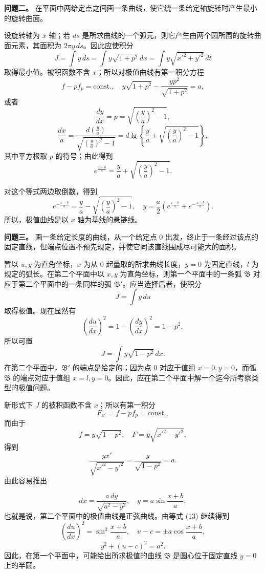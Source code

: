 \documentclass[11pt,a4paper,leqno]{article}
\providecommand{\lg}{\operatorname{lg}}
\begin{document}
\medskip
\noindent\textbf{问题二。} 在平面中两给定点之间画一条曲线，使它绕一条给定轴旋转时产生最小的旋转曲面。

设旋转轴为 $x$ 轴；若 $ds$ 是所求曲线的一个弧元，则它产生由两个圆所围的旋转曲面元素，其面积为 $2\pi y\,ds$。因此应使积分
\[
J=\int y\,ds=\int y\sqrt{1+p^2}\,dx=\int y\sqrt{x'^2+y'^2}\,dt
\]
取得最小值。被积函数不含 $x$；所以对极值曲线有第一积分方程
\[
f-pf_p=\mathrm{const.},\quad y\sqrt{1+p^2}-\frac{yp^2}{\sqrt{1+p^2}}=a,
\]
或者
\[
\frac{dy}{dx}=p=\sqrt{\left(\frac{y}{a}\right)^2-1},
\]
\[
\frac{dx}{a}=\frac{d\left(\frac{y}{a}\right)}{\sqrt{\left(\frac{y}{a}\right)^2-1}}=d\lg\left\{\frac{y}{a}+\sqrt{\left(\frac{y}{a}\right)^2-1}\right\},
\]
其中平方根取 $p$ 的符号；由此得到
\[
e^{\frac{x-b}{a}}=\frac{y}{a}+\sqrt{\left(\frac{y}{a}\right)^2-1}.
\]

对这个等式两边取倒数，得到
\[
e^{-\frac{x-b}{a}}=\frac{y}{a}-\sqrt{\left(\frac{y}{a}\right)^2-1},\quad
y=\frac{a}{2}\left(e^{\frac{x-b}{a}}+e^{-\frac{x-b}{a}}\right).
\]
所以，极值曲线是以 $x$ 轴为基线的悬链线。

\medskip
\noindent\textbf{问题三。} 画一条给定长度的曲线，从一个给定点 $0$ 出发，终止于一条经过该点的固定直线，但端点位置不预先规定，并使它同该直线围成尽可能大的面积。

暂以 $u,y$ 为直角坐标，$x$ 为从 $0$ 起量取的所求曲线长度，$y=0$ 为固定直线，$l$ 为规定的弧长。在第二个平面中以 $x,y$ 为直角坐标，则第一个平面中的一条弧 $\mathfrak{B}$ 对应于第二个平面中的一条同样的弧 $\mathfrak{B}'$。应当选择后者，使积分
\[
J=\int y\,du
\]
取得极值。现在显然有
\begin{equation}\tag{13}
\left(\frac{du}{dx}\right)^2=1-\left(\frac{dy}{dx}\right)^2=1-p^2,
\end{equation}
所以可置
\[
J=\int y\sqrt{1-p^2}\,dx.
\]
在第二个平面中，$\mathfrak{B}'$ 的端点是给定的；因为点 $0$ 对应于值组 $x=0,y=0$，而弧 $\mathfrak{B}$ 的端点对应于值组 $x=l,y=0$。因此，应在第二个平面中解一个迄今所考察类型的极值问题。

新形式下 $J$ 的被积函数不含 $x$；所以有第一积分
\[
F_{x'}=f-pf_p=\mathrm{const.},
\]
而由于
\[
f=y\sqrt{1-p^2},\quad F=y\sqrt{x'^2-y'^2},
\]
得到
\[
\frac{yx'}{\sqrt{x'^2-y'^2}}=\frac{y}{\sqrt{1-p^2}}=a.
\]
由此容易推出

\[
dx=\frac{a\,dy}{\sqrt{a^2-y^2}},\quad y=a\sin\frac{x+b}{a};
\]
也就是说，第二个平面中的极值曲线是正弦曲线。由等式 (13) 继续得到
\[
\left(\frac{du}{dx}\right)^2=\sin^2\frac{x+b}{a},\quad u-c=\pm a\cos\frac{x+b}{a},
\]
\[
y^2+(u-c)^2=a^2.
\]
因此，在第一个平面中，可能给出所求极值的曲线 $\mathfrak{B}$ 是圆心位于固定直线 $y=0$ 上的半圆。
\end{document}
